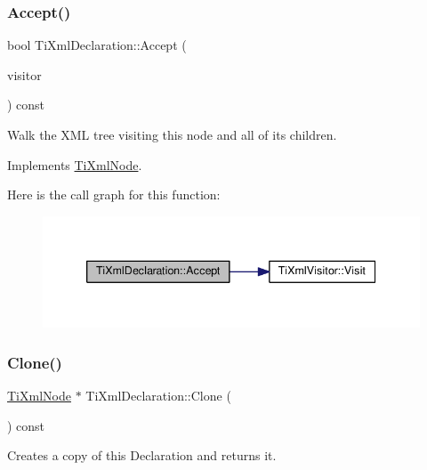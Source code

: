 \subsubsection{\texorpdfstring{Accept()}{Accept()}}
{\footnotesize\ttfamily bool Ti\+Xml\+Declaration\+::\+Accept (\begin{DoxyParamCaption}\item[{\hyperlink{class_ti_xml_visitor}{Ti\+Xml\+Visitor} $\ast$}]{visitor }\end{DoxyParamCaption}) const\hspace{0.3cm}{\ttfamily [virtual]}}

Walk the X\+ML tree visiting this node and all of its children. 

Implements \hyperlink{class_ti_xml_node_acc0f88b7462c6cb73809d410a4f5bb86}{Ti\+Xml\+Node}.

Here is the call graph for this function\+:
\nopagebreak
\begin{figure}[H]
\begin{center}
\leavevmode
\includegraphics[width=339pt]{class_ti_xml_declaration_aa1b6bade6c989407ce9881bdfc73c1e6_cgraph}
\end{center}
\end{figure}
\mbox{\label{class_ti_xml_declaration_a35dc1455f69b79e81cae28e186944610}} 
\subsubsection{\texorpdfstring{Clone()}{Clone()}}
{\footnotesize\ttfamily \hyperlink{class_ti_xml_node}{Ti\+Xml\+Node} $\ast$ Ti\+Xml\+Declaration\+::\+Clone (\begin{DoxyParamCaption}{ }\end{DoxyParamCaption}) const\hspace{0.3cm}{\ttfamily [virtual]}}



Creates a copy of this Declaration and returns it. 



